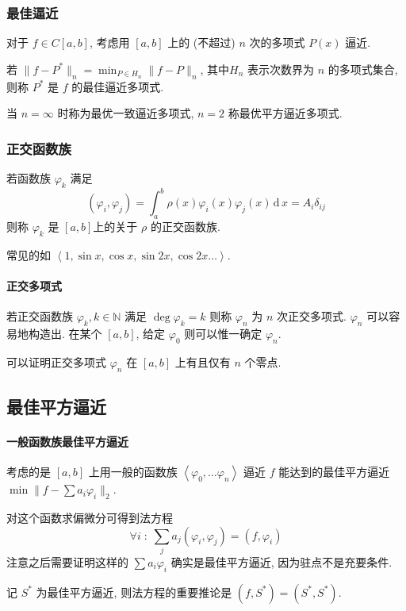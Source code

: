 \documentclass{ctexart}
\newcommand{\Nset}{\mathbb{N}}
\newcommand{\ud}{\,\mathrm{d}\,}
\begin{document}
\subsubsection{最佳逼近}
    对于 $f \in C[a,b]$, 考虑用 $[a,b]$ 上的 (不超过) $n$ 次的多项式 $P(x)$ 逼近.\par
    若 $\| f - P^* \|_{n} = \min_{P \in H_n} \| f - P\|_n $, 其中$H_n$ 表示次数界为 $n$ 的多项式集合,
    则称 $P^*$ 是 $f$ 的最佳逼近多项式.\par
    当 $n = \infty$ 时称为最优一致逼近多项式, $n = 2$ 称最优平方逼近多项式.\par

\subsubsection{正交函数族}
    若函数族 $\varphi_k$ 满足 \[
        (\varphi_i,\varphi_j) = \int_a^b \rho(x) \varphi_i(x) \varphi_j(x) \ud x = A_i\delta_{ij}\]
    则称 $\varphi_k$ 是 $[a,b]$上的关于 $\rho$ 的正交函数族.\par
    常见的如 $\left\langle 1, \sin x, \cos x, \sin 2x, \cos 2x \ldots \right\rangle$.\par
\paragraph{正交多项式}
    若正交函数族 $\varphi_k,k \in \Nset$ 满足 $\deg \varphi_k = k$ 则称 $\varphi_n$ 为 $n$ 次正交多项式.
    $\varphi_n$ 可以容易地构造出. 在某个 $[a,b]$, 给定 $\varphi_0$ 则可以惟一确定 $\varphi_n$.\par
    可以证明正交多项式 $\varphi_n$ 在 $[a,b]$ 上有且仅有 $n$ 个零点.

\subsection{最佳平方逼近}
\paragraph{一般函数族最佳平方逼近}
    考虑的是 $[a,b]$ 上用一般的函数族
    $\left\langle \varphi_0, \ldots \varphi_n \right\rangle$
    逼近 $f$ 能达到的最佳平方逼近 $ \min \| f - \sum a_i \varphi_i \|_2$.\par
    对这个函数求偏微分可得到法方程 \[
        \forall i\;:\;\sum_j a_j (\varphi_i, \varphi_j)  = (f, \varphi_i)
    \]
    注意之后需要证明这样的 $\sum a_i \varphi_i $ 确实是最佳平方逼近,
    因为驻点不是充要条件.\par
    记 $S^*$ 为最佳平方逼近, 则法方程的重要推论是 $(f, S^*) = (S^*, S^*)$.
\end{document}
